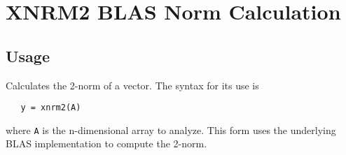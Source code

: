 \section{XNRM2 BLAS Norm Calculation}

\subsection{Usage}

Calculates the 2-norm of a vector.  The syntax for its use
is
\begin{verbatim}
   y = xnrm2(A)
\end{verbatim}
where \verb|A| is the n-dimensional array to analyze.  This form
uses the underlying BLAS implementation to compute the 2-norm.
